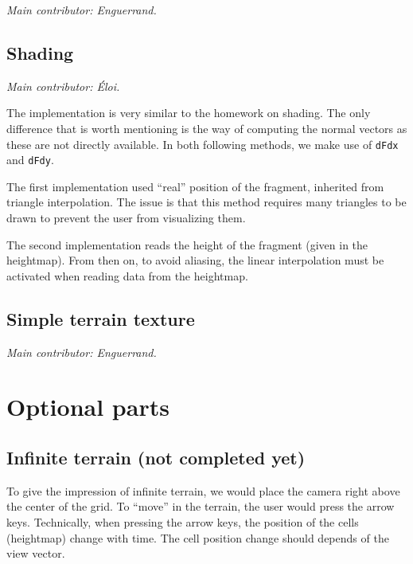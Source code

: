 \documentclass[12pt]{article}
\begin{document}
{\it Main contributor: Enguerrand.}

\subsection{Shading}

{\it Main contributor: Éloi.}

The implementation is very similar to the homework on shading. The only difference that is worth mentioning is the way of computing the normal vectors as these are not directly available. In both following methods, we make use of \texttt{dFdx} and \texttt{dFdy}.

The first implementation used ``real'' position of the fragment, inherited from triangle interpolation. The issue is that this method requires many triangles to be drawn to prevent the user from visualizing them.

The second implementation reads the height of the fragment (given in the heightmap). From then on, to avoid aliasing, the linear interpolation must be activated when reading data from the heightmap.

\subsection{Simple terrain texture}

{\it Main contributor: Enguerrand.}



\section{Optional parts}

\subsection{Infinite terrain (not completed yet)}

To give the impression of infinite terrain, we would place the camera right above the center of the grid. To ``move'' in the terrain, the user would press the arrow keys. Technically, when pressing the arrow keys, the position of the cells (heightmap) change with time. The cell position change should depends of the view vector.
\end{document}
